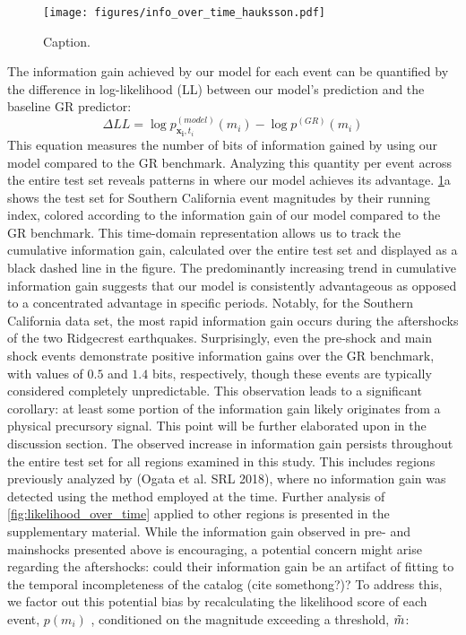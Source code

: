 \documentclass[pdflatex]{sn-jnl}
\begin{document}
   
    
\begin{figure}[h!]
    \centering
    \texttt{[image: figures/info\_over\_time\_hauksson.pdf]}
    \caption{
        Caption.
    }
    \label{fig:info_gain_over_time}
\end{figure}
    


The information gain achieved by our model for each event can be quantified by the difference in log-likelihood (LL) between our model's prediction and the baseline GR predictor:
\begin{equation}
    \Delta LL = \log{p_{\pmb{x_i}, t_i}^{(model)}(m_i)} - \log{p^{(GR)}(m_i)}
    \label{eq:information_gain}
\end{equation}
This equation measures the number of bits of information gained by using our model compared to the GR benchmark. Analyzing this quantity per event across the entire test set reveals patterns in where our model achieves its advantage. \ref{fig:info_gain_over_time}a shows the test set for Southern California event magnitudes by their running index, colored according to the information gain of our model compared to the GR benchmark. This time-domain representation allows us to track the cumulative information gain, calculated over the entire test set and displayed as a black dashed line in the figure. The predominantly increasing trend in cumulative information gain suggests that our model is consistently advantageous as opposed to a concentrated advantage in specific periods. Notably, for the Southern California data set, the most rapid information gain occurs during the aftershocks of the two Ridgecrest earthquakes. Surprisingly, even the pre-shock and main shock events demonstrate positive information gains over the GR benchmark, with values of $0.5$ and $1.4$ bits, respectively, though these events are typically considered completely unpredictable. This observation leads to a significant corollary: at least some portion of the information gain likely originates from a physical precursory signal. This point will be further elaborated upon in the discussion section.
\newline
The observed increase in information gain persists throughout the entire test set for all regions examined in this study. This includes regions previously analyzed by (Ogata et al. SRL 2018), where no information gain was detected using the method employed at the time. Further analysis of \ref{fig:likelihood_over_time} applied to other regions is presented in the supplementary material.
\newline
While the information gain observed in pre- and mainshocks presented above is encouraging, a potential concern might arise regarding the aftershocks: could their information gain be an artifact of fitting to the temporal incompleteness of the catalog (cite somethong?)? To address this, we factor out this potential bias by recalculating the likelihood score of each event, $p(m_i)$ , conditioned on the magnitude exceeding a threshold, $\Tilde{m}$:
\end{document}
